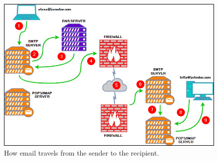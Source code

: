 \begin{figure}[H]
    \includegraphics[width=\linewidth]{figs/email_flow.png}
    \caption{How email travels from the sender to the recipient.}
    \label{fig:c2:email_flow}
  \end{figure}